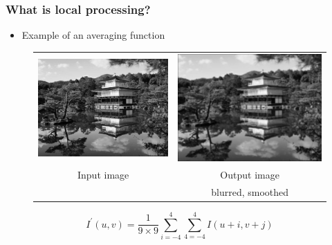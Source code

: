 \documentclass[english,11pt,table,handout]{beamer}
\begin{document}
\frame
{
	\frametitle{What is local processing?}
	\begin{itemize}
		\item Example of an averaging function
	\end{itemize}
	\centering
	\begin{figure}[!h]
		\begin{tabular}{cc}
			\includegraphics[scale=0.11]{kyoto_gray.jpg} &
			\includegraphics[scale=0.11]{kyoto_gray_smooth_9.jpg} \\
			Input image & Output image \\
						& blurred, smoothed
		\end{tabular}
	\end{figure}
	
	\begin{equation*}
	I^{'}{(u,v)} = \frac{1}{9\times 9}\sum_{i=-4}^{4}{\sum_{4=-4}^{4}{I(u+i, v+j)}}
	\end{equation*}
}
\end{document}
